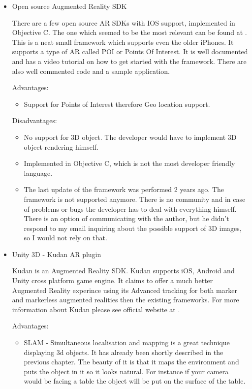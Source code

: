 \documentclass[thesis=M,english]{FITthesis}[2012/10/20]
\begin{document}
\begin{itemize}
	\item{Open source Augmented Reality SDK}
	
	There are a few open source AR SDKs with IOS support, implemented in Objective C. The one which seemed to be the most relevant can be found at  \cite{ar-github}. This is a neat small framework which supports even the older iPhones. It supports a type of AR called POI or Points Of Interest. It is well documented and has a video tutorial on how to get started with the framework. There are also well commented code and a sample application.
	
	Advantages:
	\begin{itemize}
		\item{Support for Points of Interest} therefore Geo location support.
	\end{itemize}
	
	Disadvantages:
	\begin{itemize}
		\item{No support for 3D object. The developer would have to implement 3D object rendering himself.}
		\item{Implemented in Objective C, which is not the most developer friendly language.}
		\item{The last update of the framework was performed 2 years ago. The framework is not supported anymore. There is no community and in case of problems or bugs the developer has to deal with everything himself. There is an option of communicating with the author, but he didn't respond to my email inquiring about the possible support of 3D images, so I would not rely on that.}
	\end{itemize}

	\item{Unity 3D - Kudan AR plugin}
	
	Kudan is an Augmented Reality SDK.  Kudan supports iOS, Android and Unity cross platform game engine. It claims to offer a much better Augmented Reality experince using its Advanced tracking for both marker and markerless augmented realities then the existing frameworks. For more information about Kudan please see official website at \cite{kudan}.
	
	Advantages:
	\begin{itemize}
		\item{SLAM} - Simultaneous localisation and mapping is a great technique displaying 3d objects. It has already been shortly described in the previous chapter. The beauty of it is that it maps the environment and puts the object in it so it looks natural. For instance if your camera would be facing a table the object will be put on the surface of the table.
		

\end{itemize}
\end{itemize}
\end{document}
